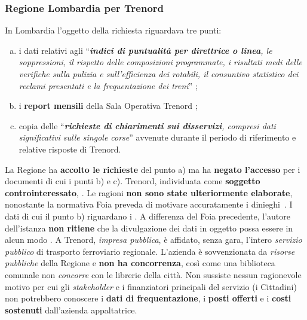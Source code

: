 \documentclass[12pt,a4paper,italian]{report}
\begin{document}
\subsubsection{Regione Lombardia per Trenord}

In Lombardia l'oggetto della richiesta riguardava tre punti:
\begin{enumerate}[a)]
    \item i dati relativi agli ``\textit{\textbf{indici di puntualità
            per direttrice o linea}, le soppressioni, il rispetto
        delle composizioni programmate, i risultati medi delle
        verifiche sulla pulizia e sull'efficienza dei rotabili, il
        consuntivo statistico dei reclami presentati e la
        frequentazione dei treni}'' \cite[allegato 11]{LombardiaDati};
    \item i \textbf{report mensili} della Sala Operativa Trenord
    \cite[art.\@ 31, paragrafo 3]{LombardiaDati};
    \item copia delle ``\textit{\textbf{richieste di chiarimenti sui
            disservizi}, compresi dati significativi sulle singole
        corse}'' \cite[art.\@ 32, paragrafo 6]{LombardiaDati} avvenute
    durante il periodo di riferimento e relative risposte di Trenord.
\end{enumerate}

La Regione ha \textbf{accolto le richieste} del punto a) ma ha
\textbf{negato l'accesso} per i documenti di cui i punti b) e c).
Trenord, individuata come \textbf{soggetto controinteressato},
.  Le ragioni \textbf{non sono state ulteriormente
    elaborate}, nonostante la normativa Foia preveda di motivare
accuratamente i dinieghi~\cite[art.\ 5, comma 6]{Dlgs33}.  I dati di
cui il punto b) riguardano i .  A differenza del Foia precedente, l'autore
dell'istanza \textbf{non ritiene} che la divulgazione dei dati in
oggetto possa essere in alcun modo
.  A Trenord, \textit{impresa
    pubblica}, è affidato, senza gara, l'intero \textit{servizio
    pubblico} di trasporto ferroviario regionale.  L'azienda è
sovvenzionata da \textit{risorse pubbliche} della Regione e
\textbf{non ha concorrenza}, così come una biblioteca comunale non
\textit{concorre} con le librerie della città.  Non sussiste nessun
ragionevole motivo per cui gli \textit{stakeholder} e i finanziatori
principali del servizio (i Cittadini) non potrebbero conoscere i
\textbf{dati di frequentazione}, i \textbf{posti offerti} e i
\textbf{costi sostenuti} dall'azienda appaltatrice.
\end{document}
